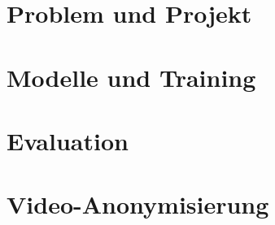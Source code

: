 
\section{Problem und Projekt}













\section{Modelle und Training}











\section{Evaluation}









\section{Video-Anonymisierung}











